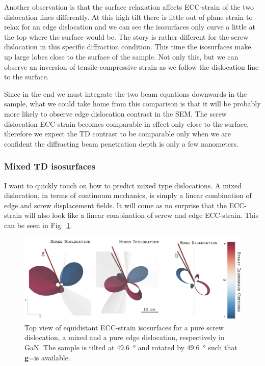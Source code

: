 Another observation is that the surface relaxation affects ECC-strain of the two dislocation lines differently. At this high tilt there is little out of plane strain to relax for an edge dislocation and we can see the isosurfaces only curve a little at the top where the surface would be. The story is rather different for the screw dislocation in this specific diffraction condition. This time the isosurfaces make up large lobes close to the surface of the sample. Not only this, but we can observe an inversion of tensile-compressive strain as we follow the dislocation line to the surface. 

Since in the end we must integrate the two beam equations downwards in the sample, what we could take home from this comparison is that it will be probably more likely to observe edge dislocation contrast in the SEM. The screw dislocation ECC-strain becomes comparable in effect only close to the surface, therefore we expect the TD contrast to be comparable only when we are confident the diffracting beam penetration depth is only a few nanometers. 

\subsubsection{Mixed TD isosurfaces}

I want to quickly touch on how to predict mixed type dislocations. A mixed dislocation, in terms of continuum mechanics, is simply a linear combination of edge and screw displacement fields. It will come as no surprise that the ECC-strain will also look like a linear combination  of screw  and edge ECC-strain. This can be seen in Fig.~\ref{fig:mixed}.



\begin{figure}[ht]
    \centering
    \includegraphics[width=1\linewidth]{Figures/GaNTDtop.png}
    \caption[Mixed TD ECC-strain.]{Top view of equidistant ECC-strain isosurfaces for a pure screw dislocation, a mixed and a pure edge dislocation, respectively in GaN. The sample is tilted at \SI{49.6}{\degree} and rotated by \SI{49.6}{\degree} such that \textbf{g}=\hkl[75-3] is available.}
    \label{fig:mixed}
\end{figure}


